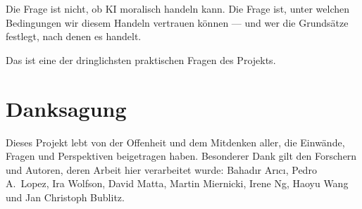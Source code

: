 \documentclass[acmcp, nonacm]{acmart}
\begin{document}
Die Frage ist nicht, ob KI moralisch handeln kann. Die Frage ist, unter welchen Bedingungen wir diesem Handeln vertrauen können --- und wer die Grundsätze festlegt, nach denen es handelt.

Das ist eine der dringlichsten praktischen Fragen des Projekts.

\section*{Danksagung}

Dieses Projekt lebt von der Offenheit und dem Mitdenken aller, die Einwände, Fragen und Perspektiven beigetragen haben. Besonderer Dank gilt den Forschern und Autoren, deren Arbeit hier verarbeitet wurde: Bahad{\i}r Ar{\i}c{\i}, Pedro A.~Lopez, Ira Wolfson, David Matta, Martin Miernicki, Irene Ng, Haoyu Wang und Jan Christoph Bublitz.



\end{document}
